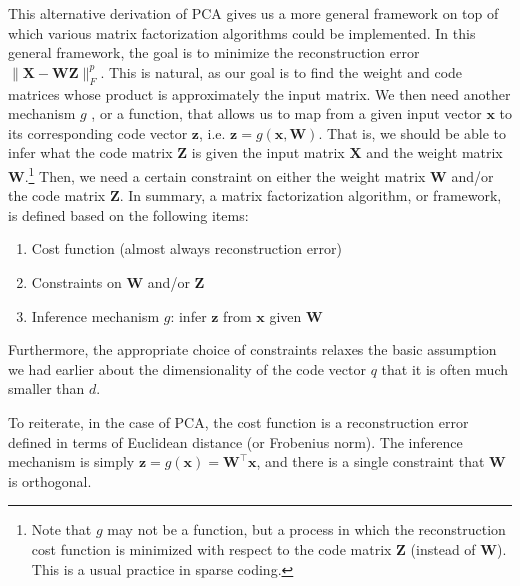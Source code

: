 \documentclass{report}
\newcommand{\vect}[1]{\mathbf{#1}}
\newcommand{\matr}[1]{\mathbf{#1}}
\newcommand{\vx}[0]{\vect{x}}
\newcommand{\vz}[0]{\vect{z}}
\newcommand{\mW}[0]{\matr{W}}
\newcommand{\mZ}[0]{\matr{Z}}
\newcommand{\mX}[0]{\matr{X}}
\begin{document}
This alternative derivation of PCA gives us a more general framework on top of
which various matrix factorization algorithms could be implemented. In this
general framework, the goal is to minimize the reconstruction error $\| \mX -
\mW \mZ\|_F^p$. This is natural, as our goal is to find the weight and code
matrices whose product is approximately the input matrix. We then need another
mechanism $g$ , or a function, that allows us to map from a given input vector
$\vx$ to its corresponding code vector $\vz$, i.e. $\vz =g(\vx, \mW)$. That is,
we should be able to infer what the code matrix $\mZ$ is given the input matrix
$\mX$ and the weight matrix $\mW$.\footnote{
    Note that $g$ may not be a function, but a process in which the
    reconstruction cost function is minimized with respect to the code matrix
    $\mZ$ (instead of $\mW$). This is a usual practice in sparse coding.  
} 
Then, we need a certain constraint on either the weight matrix $\mW$ and/or the
code matrix $\mZ$. In summary, a matrix factorization algorithm, or framework,
is defined based on the following items:
\begin{enumerate}
    \item Cost function (almost always reconstruction error)
    \item Constraints on $\mW$ and/or $\mZ$
    \item Inference mechanism $g$: infer $\vz$ from $\vx$ given $\mW$
\end{enumerate}
Furthermore, the appropriate choice of constraints relaxes the basic assumption
we had earlier about the dimensionality of the code vector $q$ that it is often
much smaller than $d$. 

To reiterate, in the case of PCA, the cost function is a reconstruction error
defined in terms of Euclidean distance (or Frobenius norm). The inference
mechanism is simply $\vz = g(\vx) = \mW^\top \vx$, and there is a single
constraint that $\mW$ is orthogonal.
\end{document}
